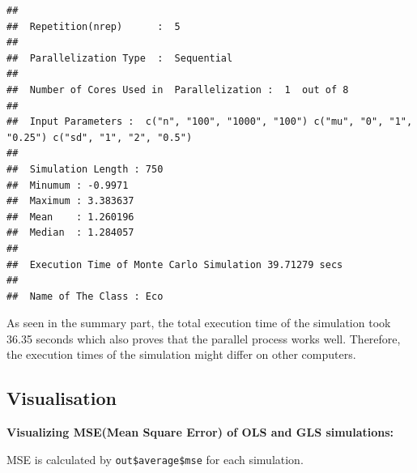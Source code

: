 \documentclass[11pt,a4paper]{article}
\begin{document}
\begin{verbatim}
## 
##  Repetition(nrep)      :  5 
## 
##  Parallelization Type  :  Sequential 
## 
##  Number of Cores Used in  Parallelization :  1  out of 8 
## 
##  Input Parameters :  c("n", "100", "1000", "100") c("mu", "0", "1", "0.25") c("sd", "1", "2", "0.5") 
## 
##  Simulation Length : 750 
##  Minumum : -0.9971 
##  Maximum : 3.383637 
##  Mean    : 1.260196 
##  Median  : 1.284057 
## 
##  Execution Time of Monte Carlo Simulation 39.71279 secs 
## 
##  Name of The Class : Eco
\end{verbatim}

As seen in the summary part, the total execution time of the simulation
took 36.35 seconds which also proves that the parallel process works
well. Therefore, the execution times of the simulation might differ on
other computers.

\hypertarget{visualisation}{%
\subsection{Visualisation}\label{visualisation}}

\textbf{Visualizing MSE(Mean Square Error) of OLS and GLS simulations:}

MSE is calculated by \texttt{out\$average\$mse} for each simulation.
\end{document}
